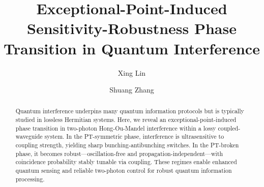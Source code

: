 \documentclass[%
reprint,
superscriptaddress,
amsthm,amsmath,amssymb,
aps,
]{revtex4-1}
\begin{document}
	
	\title{Exceptional-Point-Induced Sensitivity-Robustness Phase Transition in Quantum Interference }
	
%
	\author{Xing Lin}
	\author{Shuang Zhang}
	
	
	
	\begin{abstract}		
		Quantum interference underpins many quantum information protocols but is typically studied in lossless Hermitian systems. Here, we reveal an exceptional-point-induced phase transition in two-photon Hong-Ou-Mandel interference within a lossy coupled-waveguide system. In the PT-symmetric phase, interference is ultrasensitive to coupling strength, yielding sharp bunching-antibunching switches. In the PT-broken phase, it becomes robust—oscillation-free and propagation-independent—with coincidence probability stably tunable via coupling. These regimes enable enhanced quantum sensing and reliable two-photon control for robust quantum information processing.
	\end{abstract}
	
	
	
\maketitle
\end{document}
